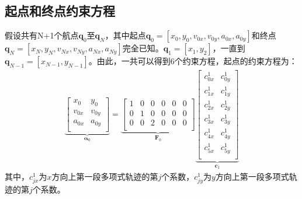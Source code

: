 \documentclass[master,academic]{ysuthesis} %
\begin{document}
		\subsection{起点和终点约束方程} 
		假设共有N+1个航点$\bm{q}_{0}$至$\bm{q}_{N}$，其中起点$\bm{q}_{0}=[x_0,y_0,v_{0x},v_{0y},a_{0x},a_{0y}]$和终点$\bm{q}_{N}=[x_N,y_N,v_{Nx},v_{Ny},a_{Nx},a_{Ny}]$完全已知。$\bm{q}_1 = [x_1,y_2]$，一直到$\bm{q}_{N-1} = [x_{N-1},y_{N-1}]$。由此，一共可以得到6个约束方程，起点的约束方程为：
		\begin{equation}
			\begin{aligned}
			\underbrace{\begin{bmatrix}
				x_0&		y_0\\
				v_{0x}&		v_{0y}\\
				a_{0x}&		a_{0y}\\
			\end{bmatrix}}_{\bm{\alpha}_0} 
			 = \underbrace{\begin{bmatrix}
				1&		0&		0&		0&		0&		0\\
				0&		1&		0&		0&		0&		0\\
				0&		0&		2&		0&		0&		0\\
			\end{bmatrix}}_{\bm{F}_0}
			\underbrace{\begin{bmatrix}
				c_{0x}^{1}&		c_{0y}^{1}\\
				c_{1x}^{1}&		c_{1y}^{1}\\
				c_{2x}^{1}&		c_{2y}^{1}\\
				c_{3x}^{1}&		c_{3y}^{1}\\
				c_{4x}^{1}&		c_{4y}^{1}\\
				c_{5x}^{1}&		c_{5y}^{1}\\
			\end{bmatrix}}_{\bm{c}_1}
			\end{aligned}
		\end{equation}
		其中，$c^1_{jx}$为$x$方向上第一段多项式轨迹的第$j$个系数，$c^1_{jy}$为$y$方向上第一段多项式轨迹的第$j$个系数。
\end{document}
